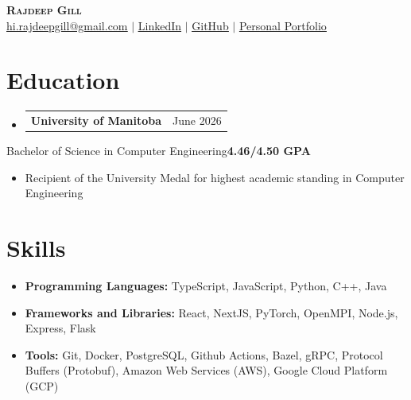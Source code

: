 \documentclass[11pt]{article}
\makeatletter
\newcommand{\resumeSubheadingInline}[3]{
  \vspace{2pt}\item
  \begin{tabular*}{0.95\textwidth}[t]{l@{\extracolsep{\fill}}r}
    \hspace{1.2em}\textbf{#1} \textit{\small #3} & #2
  \end{tabular*}\vspace{-7pt}
}
\newcommand{\resumeSubHeadingListStart}{\begin{itemize}[leftmargin=0.15in, label={}]}
\newcommand{\resumeSubHeadingListEnd}{\end{itemize}}
\makeatother
\begin{document}
\vspace{-1em}
\begin{center}
	\textbf{\LARGE\scshape Rajdeep Gill}\\
	\href{hi.rajdeepgill@gmail.com}{\underline{hi.rajdeepgill@gmail.com}} $|$
	\href{https://www.linkedin.com/in/gill-rajdeep/}{\underline{LinkedIn}} $|$
	\href{https://github.com/rajdeep-gill}{\underline{GitHub}} $|$
  \href{https://rajdeepgill.me}{\underline{Personal Portfolio}}
\end{center}
\vspace{-1.5em}
\section{Education}
\resumeSubHeadingListStart
\resumeSubheadingInline
{University of Manitoba}{June 2026}{}
\resumeSubHeadingListEnd
\vspace{-0.4em}
\small{{\quad Bachelor of Science in Computer Engineering}\hfill {\textbf{4.46/4.50 GPA}}
  \begin{itemize}
    \vspace{-0.5em}
    \item Recipient of the University Medal for highest academic standing in Computer Engineering
  \end{itemize}
}

\section{Skills}
\begin{itemize}[leftmargin=1.5em, label={}, itemsep=0.05em, topsep=0pt]
  \small\item \textbf{Programming Languages:} TypeScript, JavaScript, Python, C++, Java
  \small\item \textbf{Frameworks and Libraries:} React, NextJS, PyTorch, OpenMPI, Node.js, Express, Flask
  \small\item \textbf{Tools:} Git, Docker, PostgreSQL, Github Actions, Bazel, gRPC, Protocol Buffers (Protobuf), Amazon Web Services (AWS), Google Cloud Platform (GCP)
\end{itemize}


\end{document}
